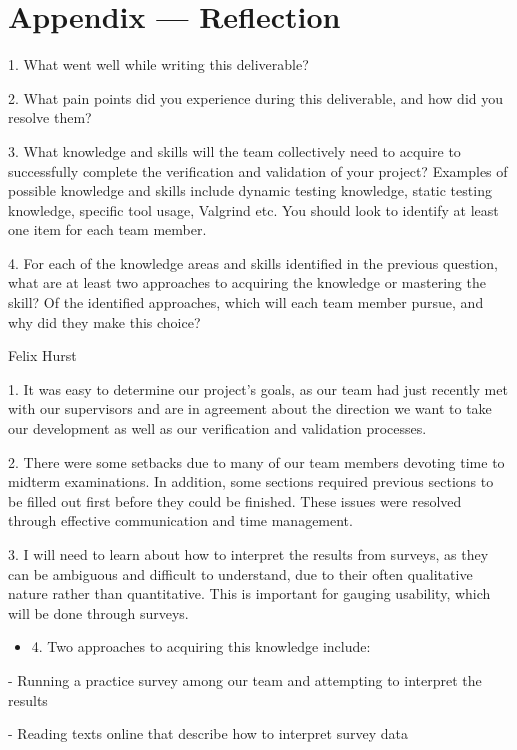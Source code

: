 \documentclass[12pt, titlepage]{article}
\begin{document}
\section{Appendix — Reflection}

1. What went well while writing this deliverable?

2. What pain points did you experience during this deliverable, and how did you resolve them?

3. What knowledge and skills will the team collectively need to acquire to successfully complete the verification and validation of your project? Examples of possible knowledge and skills include dynamic testing knowledge, static testing knowledge, specific tool usage, Valgrind etc. You should look to identify at least one item for each team member.

4. For each of the knowledge areas and skills identified in the previous question, what are at least two approaches to acquiring the knowledge or mastering the skill? Of the identified approaches, which will each team member pursue, and why did they make this choice?

Felix Hurst

1. It was easy to determine our project's goals, as our team had just recently met with our supervisors and are in agreement about the direction we want to take our development as well as our verification and validation processes.

2. There were some setbacks due to many of our team members devoting time to midterm examinations. In addition, some sections required previous sections to be filled out first before they could be finished. These issues were resolved through effective communication and time management.

3. I will need to learn about how to interpret the results from surveys, as they can be ambiguous and difficult to understand, due to their often qualitative nature rather than quantitative. This is important for gauging usability, which will be done through surveys.

\begin{itemize}
  \item 4. Two approaches to acquiring this knowledge include:
\end{itemize}

- Running a practice survey among our team and attempting to interpret the results

- Reading texts online that describe how to interpret survey data
\end{document}
